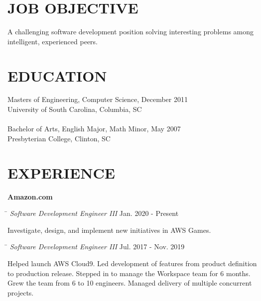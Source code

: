 \documentclass{res}
\begin{document}
 

\address{\bf  }
\address{\bf ADDRESS \\ 1940 9th Ave W\\Seattle, WA 98119\\(206) 305-2584}
                                  
\begin{resume}

\section{JOB OBJECTIVE}          
    A challenging software development position solving interesting problems among intelligent, experienced peers. 


\section{EDUCATION}          
    Masters of Engineering, Computer Science, December 2011   \\       
    University of South Carolina, Columbia, SC  \\        
    \\Bachelor of Arts, English Major, Math Minor, May 2007\\
    Presbyterian College, Clinton, SC

 
\section{EXPERIENCE}
    {\bf Amazon.com}\vspace{-20pt}
    \begin{tabbing}\hspace{4.6in}\= \kill
    {\emph{Software Development Engineer III}}     \>Jan. 2020 - Present\\
    \end{tabbing}\vspace{-30pt}
    Investigate, design, and implement new initiatives in AWS Games.
    \vspace{-10pt}

    \begin{tabbing}\hspace{4.6in}\= \kill
    {\emph{Software Development Engineer III}}     \>Jul. 2017 - Nov. 2019\\
    \end{tabbing}\vspace{-30pt}
    Helped launch AWS Cloud9.  Led development of features from product definition
    to production release.  Stepped in to manage the Workspace team for 6 months.  
    Grew the team from 6 to 10 engineers.  Managed delivery of multiple concurrent projects.  
    \vspace{-10pt}


\end{resume}
\end{document}
